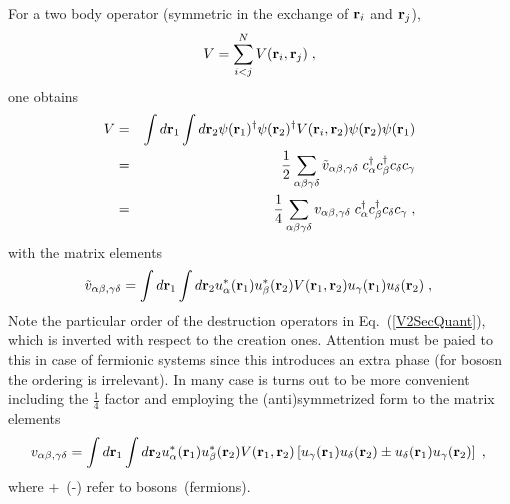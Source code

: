 For a two body operator (symmetric in the exchange of ${\bf r}_i$ and ${\bf r}_j$),
\begin{equation}
  V = \sum_{i < j}^N V({\bf r}_i, {\bf r}_j) \; ,
\label{V2}
\end{equation}
one obtains 
\begin{eqnarray}
   V &=&  \int d{\bf r}_1 \int d{\bf r}_2 \psi({\bf r}_1)^\dag \psi({\bf r}_2)^\dag
             V({\bf r}_i, {\bf r}_2) \psi({\bf r}_2)  \psi({\bf r}_1)
\nonumber \\
&=& \frac{1}{2} \sum_{\alpha \beta \gamma \delta} {\tilde v}_{\alpha \beta, \gamma \delta}
      \; c^\dag_\alpha c^\dag_\beta c_\delta c_\gamma
\label{V2SecQuant} \\
&=& \frac{1}{4} \sum_{\alpha \beta \gamma \delta}         v_{\alpha \beta, \gamma \delta}
      \; c^\dag_\alpha c^\dag_\beta c_\delta c_\gamma  \; ,
\nonumber
\end{eqnarray}
with the matrix elements
\begin{equation}
 {\tilde v}_{\alpha \beta, \gamma \delta} =
    \int d{\bf r}_1 \int d{\bf r}_2 u^*_\alpha({\bf r}_1) u^*_\beta({\bf r}_2)
             V({\bf r}_1, {\bf r}_2)  u_\gamma({\bf r}_1) u_\delta({\bf r}_2)\; ,
\label{V2me} \\
\end{equation}
Note the particular order of the destruction operators in Eq.~(\ref{V2SecQuant}), which is inverted with respect to the creation ones. Attention must be paied to this in case of fermionic systems since this introduces an extra phase (for bososn the ordering is irrelevant).
 In many case is turns out to be more convenient including the $\frac{1}{4}$ factor and employing the (anti)symmetrized form to the matrix elements
\begin{equation}
 v_{\alpha \beta, \gamma \delta} =
    \int d{\bf r}_1 \int d{\bf r}_2 u^*_\alpha({\bf r}_1) u^*_\beta({\bf r}_2)
             V({\bf r}_1, {\bf r}_2)  
  \left[ u_\gamma({\bf r}_1) u_\delta({\bf r}_2) \pm u_\delta({\bf r}_1) u_\gamma({\bf r}_2) \right] \; ,
\label{V2me_a} \\
\end{equation}
where +~(-) refer to bosons~(fermions).

